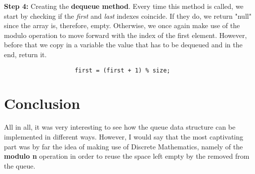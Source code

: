 \documentclass[a4paper,11pt]{article}
\begin{document}
\textbf{Step 4:} Creating the \textbf{dequeue method}. 
Every time this method is called, we start by checking if the \textit{first} and \textit{last} indexes coincide. If they do, we return "null" since the array is, therefore, empty. Otherwise, we once again make use of the modulo operation to move forward with the index of the first element. However, before that we copy in a variable the value that has to be dequeued and in the end, return it.
\begin{verbatim}
                    first = (first + 1) % size;
\end{verbatim}

\section*{Conclusion}
All in all, it was very interesting to see how the queue data structure can be implemented in different ways. However, I would say that the most captivating part was by far the idea of making use of Discrete Mathematics, namely of the \textbf{modulo n} operation in order to reuse the space left empty by the removed from the queue. 
\end{document}
